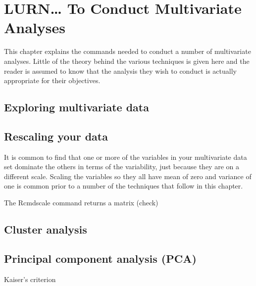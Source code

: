 



\chapter{LURN\ldots{} To Conduct Multivariate Analyses} 
\label{Multivariate} 
 



 
This chapter explains the commands needed to conduct a number of multivariate analyses. Little of the theory behind the various techniques is given here and the reader is assumed to know that the analysis they wish to conduct is actually appropriate for their objectives. 
 
\section{Exploring multivariate data} 
 
 
\section{} 
 
 
\section{Rescaling your data} 
 
It is common to find that one or more of the variables in your multivariate data set dominate the others in terms of the variability, just because they are on a different scale. Scaling the variables so they all have mean of zero and variance of one is common prior to a number of the techniques that follow in this chapter. 
 
The Rcmd{scale} command returns a matrix (check)  
 
\section{Cluster analysis} 
 
\section{Principal component analysis (PCA)} 
 
Kaiser's criterion 
 
